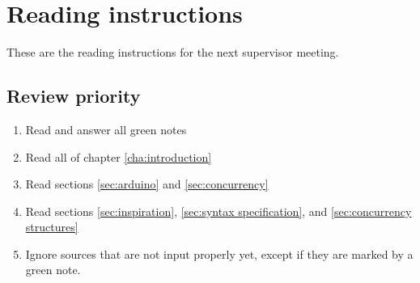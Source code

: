 \chapter{Reading instructions}
These are the reading instructions for the next supervisor meeting. 

\section{Review priority}
\begin{enumerate}
    \item Read and answer all green notes
    \item Read all of chapter \ref{cha:introduction}
    \item Read sections \ref{sec:arduino} and \ref{sec:concurrency}
    \item Read sections \ref{sec:inspiration}, \ref{sec:syntax specification}, and \ref{sec:concurrency structures}
    \item Ignore sources that are not input properly yet, except if they are marked by a green note. 
\end{enumerate}